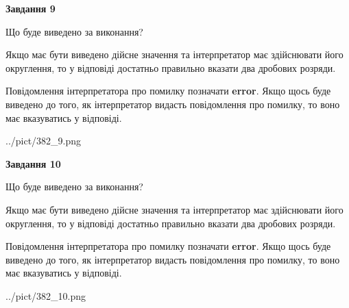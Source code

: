 \documentclass[12pt, ukrainian]{article}
\begin{document}
{\begin {Large}
{\begin {center}\textbf{Завдання 9}\end {center}}\par
Що буде виведено за виконання? \par

Якщо має бути виведено дійсне значення та інтерпретатор має здійснювати його округлення, 
то у відповіді достатньо правильно вказати два дробових розряди.

Повідомлення інтерпретатора про помилку позначати \textbf{error}.
Якщо щось буде виведено до того, як інтерпретатор видасть повідомлення про помилку, 
то воно має вказуватись у відповіді. \par

\begin{center}
	{../pict/382_9.png}
\end{center}
\newpage

{\begin {center}\textbf{Завдання 10}\end {center}}\par
Що буде виведено за виконання? \par

Якщо має бути виведено дійсне значення та інтерпретатор має здійснювати його округлення, 
то у відповіді достатньо правильно вказати два дробових розряди.

Повідомлення інтерпретатора про помилку позначати \textbf{error}.
Якщо щось буде виведено до того, як інтерпретатор видасть повідомлення про помилку, 
то воно має вказуватись у відповіді. \par

\begin{center}
	{../pict/382_10.png}
\end{center}
\newpage

\end {Large}}
\end{document}
